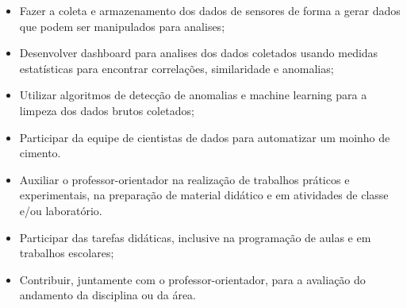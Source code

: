 \documentclass[10pt,a4paper,ragged2e]{altacv}
\begin{document}
\begin{itemize}
    \item Fazer a coleta e armazenamento dos dados de sensores de forma a gerar dados que podem ser manipulados para analises;
    \item Desenvolver dashboard para analises dos dados coletados usando medidas estatísticas para encontrar correlações, similaridade e anomalias;
    \item Utilizar algoritmos de detecção de anomalias e machine learning para a limpeza dos dados brutos coletados;
    \item Participar da equipe de cientistas de dados para automatizar um moinho de cimento.
\end{itemize}

\vspace{10px}


\begin{itemize}
    \item Auxiliar o professor-orientador na realização de trabalhos práticos e experimentais, na preparação de material didático e em atividades de classe e/ou laboratório.
\end{itemize}

\vspace{10px}

\begin{itemize}
    \item Participar das tarefas didáticas, inclusive na programação de aulas e em trabalhos escolares;
    \item Contribuir, juntamente com o professor-orientador, para a avaliação do andamento da disciplina ou da área.
\end{itemize}
\end{document}
